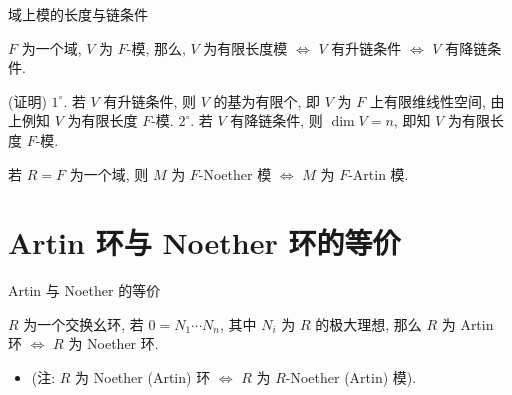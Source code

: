 \begin{frame}{域上模的长度与链条件}

\begin{prop}[域上模的长度与链条件]
$F$ 为一个域, $V$ 为 $F$-模, 那么,
$V$ 为有限长度模 $\iff$ $V$ 有升链条件 $\iff$ $V$ 有降链条件.
\end{prop}

\startproof[bg=yellow, fg=red](证明)
$1^{\circ}$. 若 $V$ 有升链条件, 则 $V$ 的基为有限个,
即 $V$ 为 $F$ 上有限维线性空间, 由上例知 $V$ 为有限长度 $F$-模.
$2^{\circ}$. 若 $V$ 有降链条件, 则 $\dim V = n$,
即知 $V$ 为有限长度 $F$-模.

\pause

\begin{cor}
若 $R = F$ 为一个域, 则 $M$ 为 $F$-Noether 模 $\iff$ $M$ 为 $F$-Artin 模.
\end{cor}

\end{frame}


\section[等价]{Artin 环与 Noether 环的等价}


\begin{frame}{Artin 与 Noether 的等价}

\begin{lem}
$R$ 为一个交换幺环, 若 $0 = N_1 \dotsm N_n$, 其中 $N_i$ 为 $R$
的极大理想, 那么 $R$ 为 Artin 环 $\iff$ $R$ 为 Noether 环.
\end{lem}

\begin{itemize}
\item (注: $R$ 为 Noether (Artin) 环 $\iff$ $R$ 为 $R$-Noether (Artin) 模).
\end{itemize}

\end{frame}


